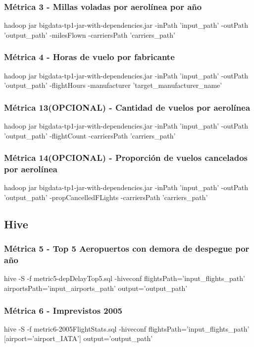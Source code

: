 \documentclass[a4paper,10pt]{article}
\begin{document}
        \subsubsection{Métrica 3 - Millas voladas por aerolínea por año}
            \scriptsize{hadoop jar bigdata-tp1-jar-with-dependencies.jar -inPath 'input\_path' -outPath 'output\_path' -milesFlown -carriersPath 'carriers\_path'}
        \subsubsection{Métrica 4 - Horas de vuelo por fabricante}
            \scriptsize{hadoop jar bigdata-tp1-jar-with-dependencies.jar -inPath 'input\_path' -outPath 'output\_path' -flightHours -manufacturer 'target\_manufacturer\_name'}
       \subsubsection{Métrica 13(OPCIONAL) - Cantidad de vuelos por aerolínea}
            \scriptsize{hadoop jar bigdata-tp1-jar-with-dependencies.jar -inPath 'input\_path' -outPath 'output\_path' -flightCount -carriersPath 'carriers\_path'}
        \subsubsection{Métrica 14(OPCIONAL) - Proporción de vuelos cancelados por aerolínea}
            \scriptsize{hadoop jar bigdata-tp1-jar-with-dependencies.jar -inPath 'input\_path' -outPath 'output\_path' -propCancelledFLights -carriersPath 'carriers\_path'}

    \subsection{Hive}
        \subsubsection{Métrica 5 - Top 5 Aeropuertos con demora de despegue por año}
        \scriptsize{hive -S -f metric5-depDelayTop5.sql -hiveconf flightsPath='input\_flights\_path' airportsPath='input\_airports\_path' output='output\_path'}
        \subsubsection{Métrica 6 - Imprevistos 2005}
        \scriptsize{hive -S -f metric6-2005FlightStats.sql -hiveconf flightsPath='input\_flights\_path' [airport='airport\_IATA'] output='output\_path'}
\end{document}

